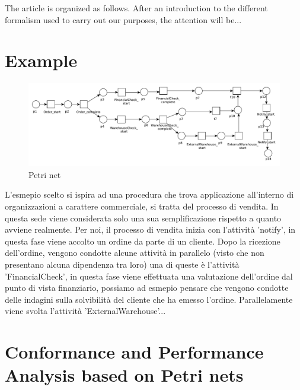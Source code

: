 \documentclass[11pt]{article}
\begin{document}
The article is organized as follows. After an introduction to the different formalism used to carry out our purposes, the attention will be...


\section{Example}\label{example}
\begin{figure}[h]\label{pnet}
\includegraphics[width=360pt]
{./items/Sales_PN.pdf}
\caption{Petri net}
\end{figure}

L'esmepio scelto si ispira ad una procedura che trova applicazione all'interno di organizzazioni a carattere commerciale, si tratta del processo di vendita. In questa sede viene considerata solo una sua semplificazione rispetto a quanto avviene realmente. Per noi, il processo di vendita inizia con l'attività 'notify', in questa fase viene accolto un ordine da parte di un cliente. Dopo la ricezione dell'ordine, vengono condotte alcune attività in parallelo (visto che non presentano alcuna dipendenza tra loro) una di queste è l'attività 'FinancialCheck', in questa fase viene effettuata una valutazione dell'ordine dal punto di vista finanziario, possiamo ad esmepio pensare che vengono condotte delle indagini sulla solvibilità del cliente che ha emesso l'ordine. Parallelamente viene svolta l'attività 'ExternalWarehouse'...

\section{Conformance and Performance Analysis based on Petri nets}\label{Background}
\end{document}
